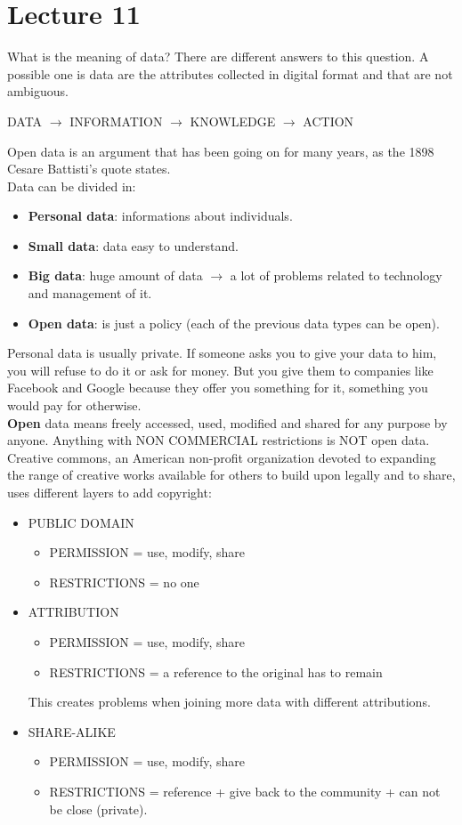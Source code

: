 \documentclass[a4paper, 10pt, titlepage]{article}
\begin{document}
\section{Lecture 11}
What is the meaning of data? There are different answers to this question. A possible one is data are the attributes collected in digital format and that are not ambiguous.
\begin{center}
DATA $\rightarrow$ INFORMATION $\rightarrow$ KNOWLEDGE $\rightarrow$ ACTION
\end{center}
Open data is an argument that has been going on for many years, as the 1898 Cesare Battisti's quote states. \medskip \\
Data can be divided in:
\begin{itemize}
\item \textbf{Personal data}: informations about individuals.
\item \textbf{Small data}: data easy to understand.
\item \textbf{Big data}: huge amount of data $\rightarrow$ a lot of problems related to technology and management of it.
\item \textbf{Open data}: is just a policy (each of the previous data types can be open).
\end{itemize}
Personal data is usually private. If someone asks you to give your data to him, you will refuse to do it or ask for money. But you give them to companies like Facebook and Google  because they offer you something for it, something you would pay for otherwise. \medskip \\
\textbf{Open} data means freely accessed, used, modified and shared for any purpose by anyone. Anything with NON COMMERCIAL restrictions is NOT open data. \medskip\\
Creative commons, an American non-profit organization devoted to expanding the range of creative works available for others to build upon legally and to share, uses different layers to add copyright:
\begin{itemize}
\item PUBLIC DOMAIN
	\begin{itemize}
	\item PERMISSION = use, modify, share
	\item RESTRICTIONS = no one
	\end{itemize}
\item ATTRIBUTION
	\begin{itemize}
	\item PERMISSION = use, modify, share
	\item RESTRICTIONS = a reference to the original has to remain
	\end{itemize}
	This creates problems when joining more data with different attributions.
\item SHARE-ALIKE
	\begin{itemize}
	\item PERMISSION = use, modify, share
	\item RESTRICTIONS = reference + give back to the community + can not be close (private).
	\end{itemize}
\end{itemize}
\end{document}
